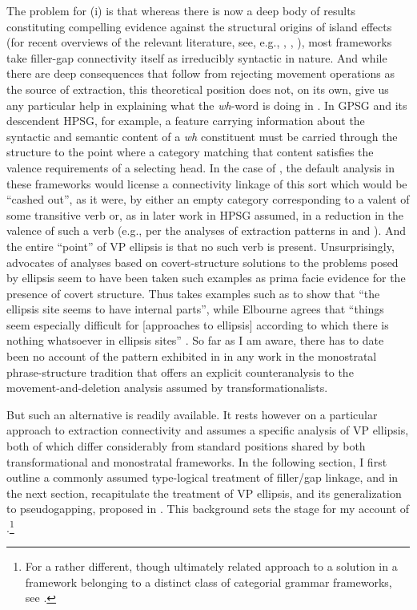 \documentclass[output=paper,colorlinks,citecolor=brown]{langscibook}
\begin{document}
The problem for (i) is that whereas there is now a deep body of
results constituting compelling evidence against the structural
origins of island effects (for recent overviews of the relevant
literature, see, e.g., \citet{chaves-putnam2020}, \citet{kubotalevineBook}, \citet{liu2022structural}),
most frameworks take filler-gap connectivity itself as irreducibly
syntactic in nature. And while there are deep consequences that follow
from rejecting movement operations as the source of extraction, this
theoretical position does not, on its own, give us any particular help
in explaining what the \textit{wh}-word is doing in . In
GPSG and its descendent HPSG, for example, a feature carrying
information about the syntactic and semantic content of a \textit{wh}
constituent must be carried through the structure to the point where a
category matching that content satisfies the valence requirements of a
selecting head. In the case of , the default analysis
in these frameworks would license a connectivity linkage of this sort
which would be ``cashed out'', as it were, by either an empty category
corresponding to a valent of some transitive verb or, as in later
work in HPSG assumed, in a reduction in the valence of such a verb
(e.g., per the analyses of extraction patterns in \citet{NoordBouma94} and
\citet{BoumaMaloufea01}). And the entire ``point'' of VP ellipsis is that no such
verb is present. Unsurprisingly, advocates of analyses based on
covert-structure solutions to the problems posed by ellipsis seem to
have been taken such examples as prima facie evidence for the presence
of covert structure.  Thus \citet{johnson2001} takes examples such as
 to show that ``the ellipsis site seems to have
internal parts'', while Elbourne agrees that ``things seem especially
difficult for [approaches to ellipsis] according to which there is
nothing whatsoever in ellipsis sites'' \citep[216]{Elbourne2008}.  So far as I
am aware, there has to date been no account of the pattern exhibited
in  in any work in the monostratal phrase-structure
tradition that offers an explicit counteranalysis to the
movement-and-deletion analysis assumed by transformationalists.

But such an alternative is readily available. It rests however on a
particular approach to extraction connectivity and assumes a specific
analysis of VP ellipsis, both of which differ considerably from
standard positions shared by both transformational and monostratal
frameworks. In the following section, I first outline a commonly
assumed type-logical treatment of filler/gap linkage, and in the next
section, recapitulate the treatment of VP ellipsis, and its
generalization to pseudogapping, proposed in
\citet{kubota-levine-pseudo}. This background sets the stage for my account
of .\footnote{For a rather different, though
ultimately related approach to a solution in a framework belonging to
a distinct class of categorial grammar frameworks, see \citet{jacobson1992}.}
\end{document}
